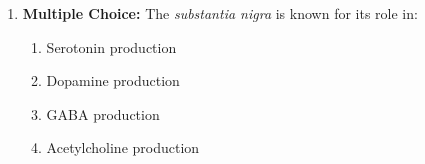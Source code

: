\begin{enumerate}[label=\textbf{Q1.9.\arabic*}]
      \item \textbf{Multiple Choice:} The \textit{substantia nigra} is known for its role in:
            \begin{enumerate}[label=(\Alph*)]
                  \item Serotonin production
                  \item Dopamine production
                  \item GABA production
                  \item Acetylcholine production
            \end{enumerate}
\end{enumerate}

